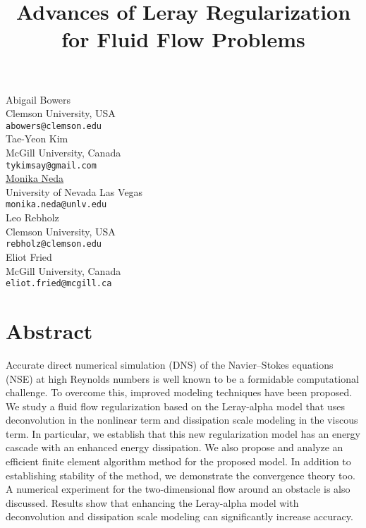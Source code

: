\documentclass[article,A4,11pt]{llncs}%
\begin{document}
\title{Advances of Leray Regularization for Fluid Flow Problems}
 \author{} \institute{}
\maketitle
\begin{center}
{\large Abigail Bowers}\\
Clemson University, USA\\
{\tt abowers@clemson.edu}
\\ \vspace{4mm}
{\large Tae-Yeon  Kim}\\
McGill University, Canada\\
{\tt tykimsay@gmail.com}
\\ \vspace{4mm}
{\large \underline{Monika Neda}}\\
University of Nevada Las Vegas\\
{\tt monika.neda@unlv.edu}
\\ \vspace{4mm}
{\large Leo Rebholz}\\
Clemson University, USA\\
{\tt rebholz@clemson.edu}
\\ \vspace{4mm}
{\large Eliot  Fried}\\
McGill University, Canada\\
{\tt eliot.fried@mcgill.ca}
\end{center}

\section*{Abstract}
Accurate direct numerical simulation (DNS) of the Navier–Stokes equations (NSE) at high Reynolds numbers is well known to be a formidable computational challenge. To overcome this, improved modeling techniques have been proposed. We study a fluid flow regularization based on the Leray-alpha model that uses deconvolution in the nonlinear term and dissipation scale modeling in the viscous term. In particular, we establish that this new regularization model has an energy cascade with an enhanced energy dissipation. We also propose and analyze an efficient finite element algorithm method for the proposed model. In addition to establishing stability of the method, we demonstrate the convergence theory too. A numerical experiment for the two-dimensional flow around an obstacle is also discussed. Results show that enhancing the Leray-alpha model with deconvolution and dissipation scale modeling can significantly increase accuracy.
\end{document}
